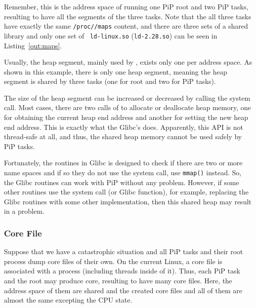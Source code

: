 Remember, this is the address space of running one PiP root and two PiP
tasks, resulting to have all the segments of the three tasks.
Note that the all three tasks have
exactly the same {\tt /proc//maps} content, and
there are three sets of a shared library and only one set of {\tt
  ld-linux.so} ({\tt ld-2.28.so}) can be seen in
Listing~\ref{out:maps}.

Usually, the heap segment, mainly used by , exists only
one per address space. As shown in this example, there is only one heap
segment, meaning the heap segment is shared by three tasks (one for
root and two for PiP tasks). 

The size of the heap segment can be increased or decreased by calling
the  system call. Most cases, there are two calls of
 to allocate or deallocate heap memory, one for
obtaining the 
current heap end address and another for setting the new heap end 
address. This is exactly what the Glibc's 
does. Apparently, this API is not thread-safe at all, and thus, 
the shared heap memory cannot be used safely by PiP tasks.

Fortunately, the  routines in Glibc is designed to check if
there are two or more name spaces and if so they do not use the
 system call, use {\tt mmap()} instead. So, the Glibc
 routines can work with PiP without any
problem. However, if some other routines use the 
system call (or  Glibc function), for example,
replacing the Glibc  routines with some other
 implementation, then this shared heap may result in a 
problem.

\subsubsection{Core File}

Suppose that we have a catastrophic situation and all PiP tasks and
their root process dump core files of their own. On the current Linux,
a core file is associated with a process (including threads inside of
it). Thus, each PiP task and the root may produce core, resulting to
have many core files. Here, the address space of them are shared and
the created core files and all of them are almost the same excepting
the CPU state. 

